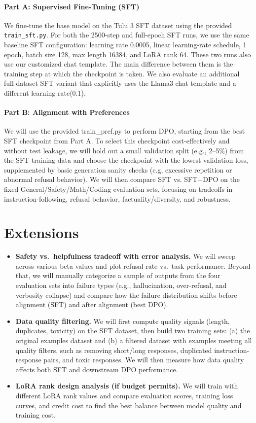 \documentclass[11pt]{article}
\begin{document}
\paragraph{Part A: Supervised Fine-Tuning (SFT)}
We fine-tune the base model on the Tulu 3 SFT dataset using the provided \texttt{train\_sft.py}. For both the 2500-step and full-epoch SFT runs, we use the same baseline SFT configuration: learning rate 0.0005, linear learning-rate schedule, 1 epoch, batch size 128, max length 16384, and LoRA rank 64. These two runs also use our customized chat template. The main difference between them is the training step at which the checkpoint is taken. We also evaluate an additional full-dataset SFT variant that explicitly uses the Llama3 chat template and a different learning rate(0.1).

\paragraph{Part B: Alignment with Preferences}
We will use the provided train\_pref.py to perform DPO, starting from the best SFT checkpoint from Part A. To select this checkpoint cost-effectively and without test leakage, we will hold out a small validation split (e.g., 2–5\%) 
from the SFT training data and choose the checkpoint with the lowest validation loss, supplemented by basic generation sanity checks (e.g, excessive repetition or abnormal refusal behavior). We will then compare SFT vs. SFT+DPO on the fixed General/Safety/Math/Coding evaluation sets, focusing on tradeoffs in instruction-following, refusal behavior, factuality/diversity, and robustness.

\section{Extensions}
\begin{itemize}
    \item \textbf{Safety vs.~helpfulness tradeoff with error analysis.}
    We will sweep across various beta values and plot refusal rate vs.~task performance. Beyond that, we will manually categorize a sample of outputs from the four evaluation sets into failure types (e.g., hallucination, over-refusal, and verbosity collapse) and compare how the failure distribution shifts before alignment (SFT) and after alignment (best DPO).

    \item \textbf{Data quality filtering.}
    We will first compute quality signals (length, duplicates, toxicity) on the SFT dataset, then build two training sets: (a) the original examples dataset and (b) a filtered dataset with examples meeting all quality filters, such as removing short/long responses, duplicated instruction-response pairs, and toxic responses. We will then measure how data quality affects both SFT and downstream DPO performance.

    \item \textbf{LoRA rank design analysis (if budget permits).}
    We will train with different LoRA rank values and compare evaluation scores, training loss curves, and credit cost to find the best balance between model quality and training cost.
\end{itemize}
\end{document}
